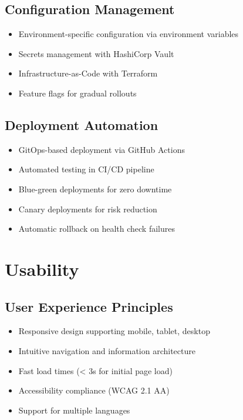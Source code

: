 \documentclass[12pt,a4paper]{report}
\begin{document}
\subsection{Configuration Management}

\begin{itemize}[label=\textbullet]
    \item Environment-specific configuration via environment variables
    \item Secrets management with HashiCorp Vault
    \item Infrastructure-as-Code with Terraform
    \item Feature flags for gradual rollouts
\end{itemize}

\subsection{Deployment Automation}

\begin{itemize}[label=\textbullet]
    \item GitOps-based deployment via GitHub Actions
    \item Automated testing in CI/CD pipeline
    \item Blue-green deployments for zero downtime
    \item Canary deployments for risk reduction
    \item Automatic rollback on health check failures
\end{itemize}

\section{Usability}

\subsection{User Experience Principles}

\begin{itemize}[label=\textbullet]
    \item Responsive design supporting mobile, tablet, desktop
    \item Intuitive navigation and information architecture
    \item Fast load times (< 3s for initial page load)
    \item Accessibility compliance (WCAG 2.1 AA)
    \item Support for multiple languages
\end{itemize}
\end{document}
